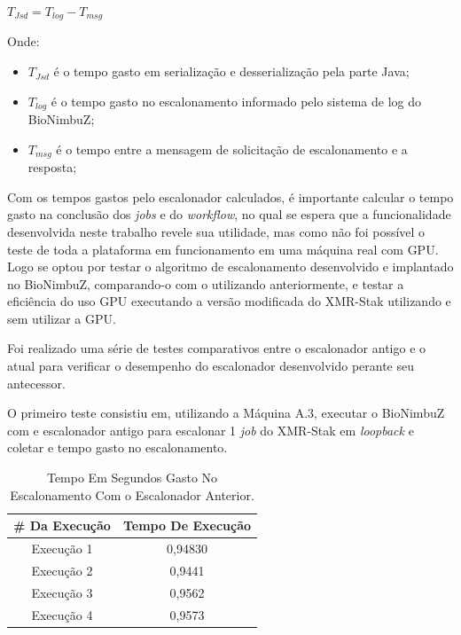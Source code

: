 \centerline{ $T_{Jsd} = T_{log} - T_{msg}$ }

Onde: 
\begin{itemize}
	\item $T_{Jsd}$ é o tempo gasto em serialização e desserialização pela parte Java;
	\item $T_{log}$ é o tempo gasto no escalonamento informado pelo sistema de log do BioNimbuZ;
	\item $T_{msg}$ é o tempo entre a mensagem de solicitação de escalonamento e a resposta;
\end{itemize}

Com os tempos gastos pelo escalonador calculados, é importante calcular o tempo gasto na conclusão dos \textit{jobs} e do \textit{workflow}, no qual se espera que a funcionalidade desenvolvida neste trabalho revele sua utilidade, mas como não foi possível o teste de toda a plataforma em funcionamento em uma máquina real com \acrshort{GPU}. Logo se optou por testar o algoritmo de escalonamento desenvolvido e implantado no BioNimbuZ, comparando-o com o utilizando anteriormente, e testar a eficiência do uso GPU executando a versão modificada do XMR-Stak utilizando e sem utilizar a \acrshort{GPU}.


Foi realizado uma série de testes comparativos entre o escalonador antigo e o atual para verificar o desempenho do escalonador desenvolvido perante seu antecessor. %

O primeiro teste consistiu em, utilizando a Máquina A.3, executar o BioNimbuZ com e escalonador antigo para escalonar 1 \textit{job} do XMR-Stak em \textit{loopback} e coletar e tempo gasto no escalonamento.

\begin {table}[H]
\begin{center}
	\begin{tabular}{ |c|c| } 
		\hline
		\#  Da Execução & Tempo De Execução \\ 
		\hline
		Execução 1 & 0,94830 \\ 
		\hline
		Execução 2 & 0,9441 \\ 
		\hline
		Execução 3 & 0,9562 \\ 
		\hline
		Execução 4 & 0,9573 \\ 
		\hline
	\end{tabular}
	\caption {Tempo Em Segundos Gasto No Escalonamento Com o Escalonador Anterior.} \label{TabelaTempoEscalonadorAntigo} 
\end{center}
\end {table}

